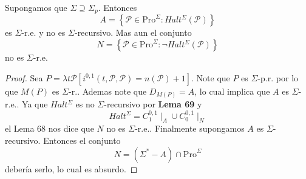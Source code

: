  \begin{lemma} Supongamos que $\Sigma \supseteq \Sigma _{p}.$ Entonces
    \[
      \displaystyle A=\left\{ \mathcal{P}\in \mathrm{Pro}^{\Sigma }:Halt^{\Sigma }(\mathcal{P} )\right\}
    \]
    es $\Sigma $-r.e. y no es $\Sigma $-recursivo. Mas aun el conjunto
    \[
      \displaystyle N=\left\{ \mathcal{P}\in \mathrm{Pro}^{\Sigma }:\lnot Halt^{\Sigma }( \mathcal{P})\right\}
    \]
    no es $\Sigma $-r.e.
  \begin{proof}
    Sea $P=\lambda t\mathcal{P}\left[ i^{0,1}(t,\mathcal{P},\mathcal{P})=n( \mathcal{P})+1\right] $.
    Note que $P$ es $\Sigma $-p.r. por lo que $M(P)$ es $\Sigma $-r.. Ademas note que $D_{M(P)}=A$,
    lo cual implica que $A$ es $ \Sigma $-r.e.. Ya que $Halt^{\Sigma }$ es no $\Sigma $-recursivo por \textbf{Lema 69} y
    \[
      \displaystyle Halt^{\Sigma }=C_{1}^{0,1}\mid _{A}\cup C_{0}^{0,1}\mid _{N}
    \]
    el Lema 68 nos dice que $N$ no es $\Sigma $-r.e.. Finalmente supongamos $A$ es $\Sigma $-recursivo. Entonces el conjunto
    \[
      \displaystyle N=\left( \Sigma ^{\ast }-A\right) \cap \mathrm{Pro}^{\Sigma }
    \]
    debería serlo, lo cual es absurdo.
  \end{proof}
  \end{lemma}
